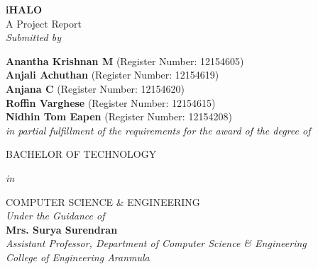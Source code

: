 \begin{titlepage}
  \begin{center}
   
  
    \Huge \textbf{iHALO}\\
    \large
    { A Project Report }\\
     \vspace{0.2cm}
    \large
    \textit{Submitted by}\\

    \vspace{0.2 cm}
    
    \large
    \textbf{Anantha Krishnan M} \large (Register Number: 12154605)\\
    \textbf{Anjali Achuthan} \large (Register Number: 12154619)\\
    \textbf{Anjana C} \large (Register Number: 12154620)\\
    \textbf{Roffin Varghese} \large (Register Number: 12154615)\\
    \textbf{Nidhin Tom Eapen} \large (Register Number: 12154208)\\
    
     
     
    \vspace{0.3cm}
    \large
    \textit{in partial fulfillment of the requirements for the award of the degree of}

    \vspace{0.2cm}
    \Large
    \MakeUppercase{Bachelor of Technology}

    \vspace{0.2cm}
    \large
    \textit{in}

    \vspace{0.2cm}
    \large
    \MakeUppercase{Computer Science \& Engineering}\\
    \vspace{0.5cm}
    \Large
    \large
    \textit{Under the Guidance of}
    \Large\\
    \textbf{Mrs. Surya Surendran} \\
    \large
    \textit{Assistant Professor, Department of Computer Science \& Engineering} \\
    \textit{College of Engineering Aranmula} \\
    
  
    \vspace{1 cm}


\end{center}
\end{titlepage}
